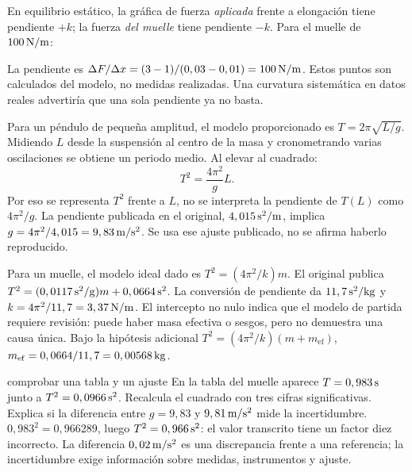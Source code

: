 \documentclass[11pt,a4paper]{article}
\begin{document}
En equilibrio est\'atico, la gr\'afica de fuerza \emph{aplicada} frente a elongaci\'on
tiene pendiente $+k$; la fuerza \emph{del muelle} tiene pendiente $-k$.
Para el muelle de $100\,\mathrm{N/m}$:
\begin{center}
\end{center}
La pendiente es $\Delta F/\Delta x=(3-1)/(0,03-0,01)=100\,\mathrm{N/m}$.
Estos puntos son calculados del modelo, no medidas realizadas.
Una curvatura sistem\'atica en datos reales advertir\'ia que una sola pendiente ya no basta.

Para un p\'endulo de peque\~na amplitud, el modelo proporcionado es
$T=2\pi\sqrt{L/g}$. Midiendo $L$ desde la suspensi\'on al centro de la masa y
cronometrando varias oscilaciones se obtiene un periodo medio.
Al elevar al cuadrado:
\[
T^2=\frac{4\pi^2}{g}L.
\]
Por eso se representa $T^2$ frente a $L$, no se interpreta la pendiente de $T(L)$
como $4\pi^2/g$. La pendiente publicada en el original,
$4,015\,\mathrm{s^2/m}$, implica $g=4\pi^2/4,015=9,83\,\mathrm{m/s^2}$.
Se usa ese ajuste publicado, no se afirma haberlo reproducido.

Para un muelle, el modelo ideal dado es $T^2=(4\pi^2/k)m$.
El original publica $T^2=(0,0117\,\mathrm{s^2/g})m+0,0664\,\mathrm{s^2}$.
La conversi\'on de pendiente da $11,7\,\mathrm{s^2/kg}$ y
$k=4\pi^2/11,7=3,37\,\mathrm{N/m}$.
El intercepto no nulo indica que el modelo de partida requiere revisi\'on:
puede haber masa efectiva o sesgos, pero no demuestra una causa \'unica.
Bajo la hip\'otesis adicional $T^2=(4\pi^2/k)(m+m_{\mathrm{ef}})$,
$m_{\mathrm{ef}}=0,0664/11,7=0,00568\,\mathrm{kg}$.

\begin{exercisebox}{comprobar una tabla y un ajuste}
En la tabla del muelle aparece $T=0,983\,\mathrm{s}$ junto a
$T^2=0,0966\,\mathrm{s^2}$. Recalcula el cuadrado con tres cifras significativas.
Explica si la diferencia entre $g=9,83$ y $9,81\,\mathrm{m/s^2}$ mide la incertidumbre.
\solutionblock
$0,983^2=0,966289$, luego $T^2=0,966\,\mathrm{s^2}$:
el valor transcrito tiene un factor diez incorrecto.
La diferencia $0,02\,\mathrm{m/s^2}$ es una discrepancia frente a una referencia;
la incertidumbre exige informaci\'on sobre medidas, instrumentos y ajuste.
\end{exercisebox}
\end{document}
